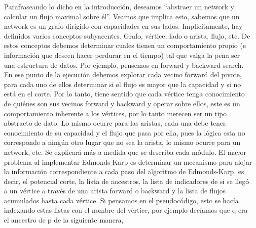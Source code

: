 \documentclass[11pt]{article}
\begin{document}
Parafraseando lo dicho en la introducción, deseamos ``abstraer un
network y calcular un flujo maximal sobre él''. Veamos que implica
esto, sabemos que un network es un grafo dirigido con capacidades en
sus lados. Implicitamente, hay definidos varios conceptos subyacentes.
Grafo, vértice, lado o arista, flujo, etc. De estos conceptos debemos
determinar cuales tienen un comportamiento propio (e información que
deseen hacer perdurar en el tiempo) tal que valga la pena ser una
estructura de datos. Por ejemplo, pensemos en forward y backward
search. En ese punto de la ejecución debemos explorar cada vecino
forward del pivote, para cada uno de ellos determinar si el flujo es
mayor que la capacidad y si no está en el corte. Por lo tanto, tiene
sentido que cada vértice tenga conocimiento de quiénes son sus
vecinos forward y backward y operar sobre ellos, este es un
comportamiento inherente a los vértices, por lo tanto merecen ser un
tipo abstracto de dato. Lo mismo ocurre para las aristas, cada una
debe tener conocimiento de su capacidad y el flujo que pasa por ella,
pues la lógica esta no corresponde a ningún otro lugar que no sea la
arista, lo mismo ocurre para un network, etc. Se explicará más a
medida que se describa cada módulo.
El mayor problema al implementar Edmonds-Karp es determinar un
mecanismo para alojar la información correspondiente a cada paso del
algoritmo de Edmonds-Karp, es decir, el potencial corte, la lista de
ancestros, la lista de indicadores de si se llegó a un vértice a
través de una arista forward o backward y la lista de flujos
acumulados hasta cada vértice. Si pensamos en el pseudocódigo, esto
se hacía indexando estas listas con el nombre del vértice, por
ejemplo decíamos que q era el ancestro de p de la siguiente manera, 
\end{document}

